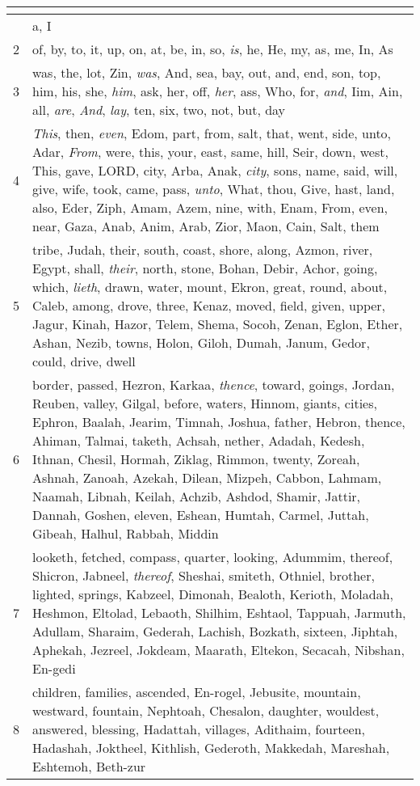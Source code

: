 \begin{center}
\begin{longtable}{l|p{3.75in}}
\hline \multicolumn{2}{c}{{ }} \\ \hline
\endfoot 
1 & a, I\\ \hline 
2 & of, by, to, it, up, on, at, be, in, so, \emph{is}, he, He, my, as, me, In, As\\ \hline 
3 & was, the, lot, Zin, \emph{was}, And, sea, bay, out, and, end, son, top, him, his, she, \emph{him}, ask, her, off, \emph{her}, ass, Who, for, \emph{and}, Iim, Ain, all, \emph{are}, \emph{And}, \emph{lay}, ten, six, two, not, but, day\\ \hline 
4 & \emph{This}, then, \emph{even}, Edom, part, from, salt, that, went, side, unto, Adar, \emph{From}, were, this, your, east, same, hill, Seir, down, west, This, gave, LORD, city, Arba, Anak, \emph{city}, sons, name, said, will, give, wife, took, came, pass, \emph{unto}, What, thou, Give, hast, land, also, Eder, Ziph, Amam, Azem, nine, with, Enam, From, even, near, Gaza, Anab, Anim, Arab, Zior, Maon, Cain, Salt, them\\ \hline 
5 & tribe, Judah, their, south, coast, shore, along, Azmon, river, Egypt, shall, \emph{their}, north, stone, Bohan, Debir, Achor, going, which, \emph{lieth}, drawn, water, mount, Ekron, great, round, about, Caleb, among, drove, three, Kenaz, moved, field, given, upper, Jagur, Kinah, Hazor, Telem, Shema, Socoh, Zenan, Eglon, Ether, Ashan, Nezib, towns, Holon, Giloh, Dumah, Janum, Gedor, could, drive, dwell\\ \hline 
6 & border, passed, Hezron, Karkaa, \emph{thence}, toward, goings, Jordan, Reuben, valley, Gilgal, before, waters, Hinnom, giants, cities, Ephron, Baalah, Jearim, Timnah, Joshua, father, Hebron, thence, Ahiman, Talmai, taketh, Achsah, nether, Adadah, Kedesh, Ithnan, Chesil, Hormah, Ziklag, Rimmon, twenty, Zoreah, Ashnah, Zanoah, Azekah, Dilean, Mizpeh, Cabbon, Lahmam, Naamah, Libnah, Keilah, Achzib, Ashdod, Shamir, Jattir, Dannah, Goshen, eleven, Eshean, Humtah, Carmel, Juttah, Gibeah, Halhul, Rabbah, Middin\\ \hline 
7 & looketh, fetched, compass, quarter, looking, Adummim, thereof, Shicron, Jabneel, \emph{thereof}, Sheshai, smiteth, Othniel, brother, lighted, springs, Kabzeel, Dimonah, Bealoth, Kerioth, Moladah, Heshmon, Eltolad, Lebaoth, Shilhim, Eshtaol, Tappuah, Jarmuth, Adullam, Sharaim, Gederah, Lachish, Bozkath, sixteen, Jiphtah, Aphekah, Jezreel, Jokdeam, Maarath, Eltekon, Secacah, Nibshan, En-gedi\\ \hline 
8 & children, families, ascended, En-rogel, Jebusite, mountain, westward, fountain, Nephtoah, Chesalon, daughter, wouldest, answered, blessing, Hadattah, villages, Adithaim, fourteen, Hadashah, Joktheel, Kithlish, Gederoth, Makkedah, Mareshah, Eshtemoh, Beth-zur\\ \hline 

\end{longtable}
\end{center}
